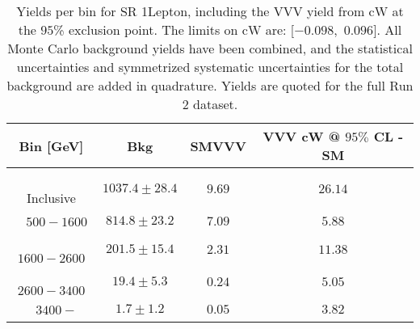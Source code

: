 \begin{table}[!htbp]
    \small
    \center
    \begin{tabular}{c||c|c|c}
    Bin [GeV] & Bkg & SMVVV & \pbox{20cm}{VVV \\ cW @ $95\%$ CL - SM \\ }\\
    \hline
    \pbox{20cm}{ ~ \\Inclusive\\ } & $1037.4 \pm 28.4$ & $9.69$ & $26.14$\\
    \hline
    \pbox{20cm}{ ~ \\$500-1600$\\ } & $814.8 \pm 23.2$ & $7.09$ & $5.88$\\
    \hline
    \pbox{20cm}{ ~ \\$1600-2600$\\ } & $201.5 \pm 15.4$ & $2.31$ & $11.38$\\
    \hline
    \pbox{20cm}{ ~ \\$2600-3400$\\ } & $19.4 \pm 5.3$ & $0.24$ & $5.05$\\
    \hline
    \pbox{20cm}{ ~ \\$3400-$\\ } & $1.7 \pm 1.2$ & $0.05$ & $3.82$\\
\end{tabular}
    \caption{Yields per bin for SR 1Lepton, including the VVV yield from cW at the $95$\% exclusion point. The limits on cW are: [$-0.098$,~$0.096$]. All Monte Carlo background yields have been combined, and the statistical uncertainties and symmetrized systematic uncertainties for the total background are added in quadrature. Yields are quoted for the full Run 2 dataset.}
    \label{tab:1Lepton$binssignal}
\end{table}
